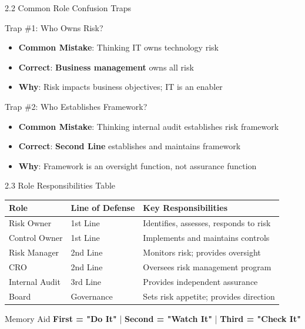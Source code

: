 \documentclass{beamer}
\begin{document}
	\begin{frame}{2.2 Common Role Confusion Traps}
		\begin{block}{Trap \#1: Who Owns Risk?}
			\begin{itemize}
				\item \textbf{Common Mistake}: Thinking IT owns technology risk
				\item \textbf{Correct}: \textbf{Business management} owns all risk
				\item \textbf{Why}: Risk impacts business objectives; IT is an enabler
			\end{itemize}
		\end{block}
		
		\begin{block}{Trap \#2: Who Establishes Framework?}
			\begin{itemize}
				\item \textbf{Common Mistake}: Thinking internal audit establishes risk framework
				\item \textbf{Correct}: \textbf{Second Line} establishes and maintains framework
				\item \textbf{Why}: Framework is an oversight function, not assurance function
			\end{itemize}
		\end{block}
	\end{frame}
	
	\begin{frame}{2.3 Role Responsibilities Table}
		\begin{table}
			\centering
			\begin{tabular}{|p{2.5cm}|p{3.5cm}|p{5cm}|}
				\hline
				\textbf{Role} & \textbf{Line of Defense} & \textbf{Key Responsibilities} \\
				\hline
				Risk Owner & 1st Line & Identifies, assesses, responds to risk \\
				\hline
				Control Owner & 1st Line & Implements and maintains controls \\
				\hline
				Risk Manager & 2nd Line & Monitors risk; provides oversight \\
				\hline
				CRO & 2nd Line & Oversees risk management program \\
				\hline
				Internal Audit & 3rd Line & Provides independent assurance \\
				\hline
				Board & Governance & Sets risk appetite; provides direction \\
				\hline
			\end{tabular}
		\end{table}
		
		\begin{exampleblock}{Memory Aid}
			\textbf{First = "Do It"} | \textbf{Second = "Watch It"} | \textbf{Third = "Check It"}
		\end{exampleblock}
	\end{frame}
	
\end{document}
